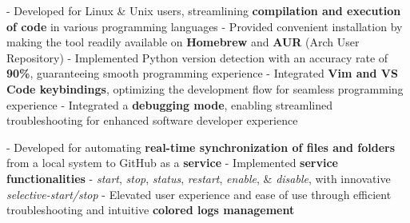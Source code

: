 \documentclass[a4paper,10pt]{extarticle} %
\begin{document}
\begin{description}[style=nextline, font=$\bullet$\hspace{2mm}\normalsize]

 \item[{\href{https://github.com/proffapt/code-runner}{Code Runner}} | Bash, Vim, VSCode] 
- Developed for Linux \& Unix users, streamlining \textbf{compilation and execution of code} in various programming languages \newline
- Provided convenient installation by making the tool readily available on \textbf{Homebrew} and \textbf{AUR} (Arch User Repository) \newline
- Implemented Python version detection with an accuracy rate of \textbf{90\%}, guaranteeing smooth programming experience \newline
- Integrated \textbf{Vim and VS Code keybindings}, optimizing the development flow for seamless programming experience \newline
- Integrated a \textbf{debugging mode}, enabling streamlined troubleshooting for enhanced software developer experience 

 \item[{\href{https://github.com/proffapt/gsync}{GSYNC}} | Bash, Linux Uitilities] 
- Developed for automating \textbf{real-time synchronization of files and folders} from a local system to GitHub as a \textbf{service} \newline
- Implemented \textbf{service functionalities} - \textit{start}, \textit{stop}, \textit{status}, \textit{restart}, \textit{enable}, \& \textit{disable}, with innovative \textit{selective-start/stop} \newline
- Elevated user experience and ease of use through efficient troubleshooting and intuitive \textbf{colored logs management}
 
\end{description}

\vspace{-0.1cm}
\end{document}

